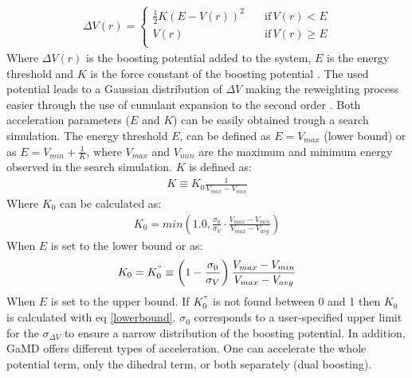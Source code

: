 \begin{equation}
  \begin{aligned}
\Delta V(r) =\begin{cases}
          \frac{1}{2} K \left ( E - V(r) \right )^2 \quad &\text{if} \, V(r) < E \\
          V(r) \quad &\text{if} \, V(r) \geq E \\
     \end{cases}
  \end{aligned}
\end{equation}
Where $\Delta V(r)$ is the boosting potential added to the system, $E$ is the energy threshold and $K$ is the force constant of the boosting potential \cite{miao2015gaussian}. The used potential leads to a Gaussian distribution of $\Delta V$ making the reweighting process easier through the use of cumulant expansion to the second order \cite{miao2014improved}. Both acceleration parameters ($E$ and $K$) can be easily obtained trough a search simulation. The energy threshold $E$, can be defined as $E = V_{max}$ (lower bound) or as $E = V_{min} + \frac{1}{K}$, where $V_{max}$ and $V_{min}$ are the maximum and minimum energy observed in the search simulation. $K$ is defined as: 
\begin{equation}
  \begin{aligned}
  K \equiv K_0 \frac{1}{V_{max} - V_{min}}
    \end{aligned}
\end{equation}
Where $K_0$ can be calculated as:
\begin{equation}
\label{lowerbound}
  \begin{aligned}
K_0 = min\left(1.0, \frac{\sigma_0}{\sigma_V} · \frac{V_{max} - V_{min}}{V_{max} - V_{avg}}\right)
    \end{aligned}
\end{equation}
When $E$ is set to the lower bound or as:
\begin{equation}
  \begin{aligned}
K_0 = K_{0}^{"} \equiv \left(1 - \frac{\sigma_0}{\sigma_V}\right)\frac{V_{max} - V_{min}}{V_{max} - V_{avg}}
  \end{aligned}
\end{equation}
When $E$ is set to the upper bound. If $K_{0}^{"}$ is not found between 0 and 1 then $K_0$ is calculated with eq \eqref{lowerbound}. $\sigma_0$ corresponds to a user-specified upper limit for the $\sigma_{\Delta V}$ to ensure a narrow distribution of the boosting potential. In addition, GaMD offers different types of acceleration. One can accelerate the whole potential term, only the dihedral term, or both separately (dual boosting).

